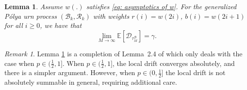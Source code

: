 \documentclass[twoside,12pt, a4paper]{article}
\newtheorem{lemma}{Lemma}[section]
\numberwithin{equation}{section}
\theoremstyle{remark}
\newtheorem{remark}{Remark}[section]
\begin{document}
	\begin{lemma} \label{lm: convergence of mean of discrepancies}
		Assume $w(.)$ satisfies \eqref{eq: asymptotics of w}.
		For the generalized P\'{o}lya urn process $(\mathcal{B}_{k},\mathcal{R}_{k})$ with weights $r(i)= w(2i)$, $b(i) = w(2i+1)$ for all $i\geq 0$, we have that
		$$
		\lim_{M\to\infty} \mathbb{E}[\mathcal{D}_{\tau_M^{\mathcal{B}}}] = \gamma. 
		$$
	\end{lemma} 
	\begin{remark}
		Lemma \ref{lm: convergence of mean of discrepancies} is a completion of Lemma~2.4 of \cite{KMP23} which only deals with the case when ${p \in (\frac{1}{2}, 1]}$. When $p \in (\frac{1}{2}, 1]$, the local drift converges absolutely, and there is a simpler argument. However, when $p \in (0,\frac{1}{2}]$ the local drift is not absolutely summable in general, requiring additional care.
	\end{remark}
\end{document}
